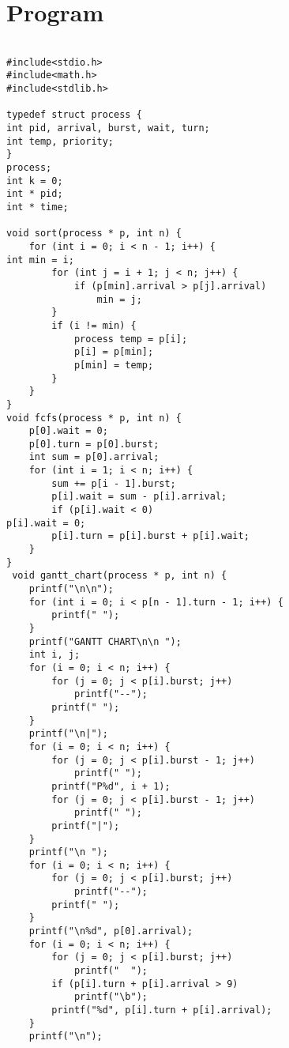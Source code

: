 \documentclass{article}
\begin{document}
\section{Program}
\begin{Verbatim}[tabsize = 4]

#include<stdio.h>
#include<math.h>
#include<stdlib.h>

typedef struct process {
int pid, arrival, burst, wait, turn;
int temp, priority;
}
process;
int k = 0;
int * pid;
int * time;

void sort(process * p, int n) {
    for (int i = 0; i < n - 1; i++) {
int min = i;
        for (int j = i + 1; j < n; j++) {
            if (p[min].arrival > p[j].arrival)
                min = j;
        }
        if (i != min) {
            process temp = p[i];
            p[i] = p[min];
            p[min] = temp;
        }
    }
}
void fcfs(process * p, int n) {
    p[0].wait = 0;
    p[0].turn = p[0].burst;
    int sum = p[0].arrival;
    for (int i = 1; i < n; i++) {
        sum += p[i - 1].burst;
        p[i].wait = sum - p[i].arrival;
        if (p[i].wait < 0)
p[i].wait = 0;
        p[i].turn = p[i].burst + p[i].wait;
    }
}
 void gantt_chart(process * p, int n) {
    printf("\n\n");
    for (int i = 0; i < p[n - 1].turn - 1; i++) {
        printf(" ");
    }
    printf("GANTT CHART\n\n ");
    int i, j;
    for (i = 0; i < n; i++) {
        for (j = 0; j < p[i].burst; j++)
            printf("--");
        printf(" ");
    }
    printf("\n|");
    for (i = 0; i < n; i++) {
        for (j = 0; j < p[i].burst - 1; j++)
            printf(" ");
        printf("P%d", i + 1);
        for (j = 0; j < p[i].burst - 1; j++)
            printf(" ");
        printf("|");
    }
    printf("\n ");
    for (i = 0; i < n; i++) {
        for (j = 0; j < p[i].burst; j++)
            printf("--");
        printf(" ");
    }
    printf("\n%d", p[0].arrival);
    for (i = 0; i < n; i++) {
        for (j = 0; j < p[i].burst; j++)
            printf("  ");
        if (p[i].turn + p[i].arrival > 9)
            printf("\b");
        printf("%d", p[i].turn + p[i].arrival);
    }
    printf("\n");


\end{Verbatim}
\end{document}
